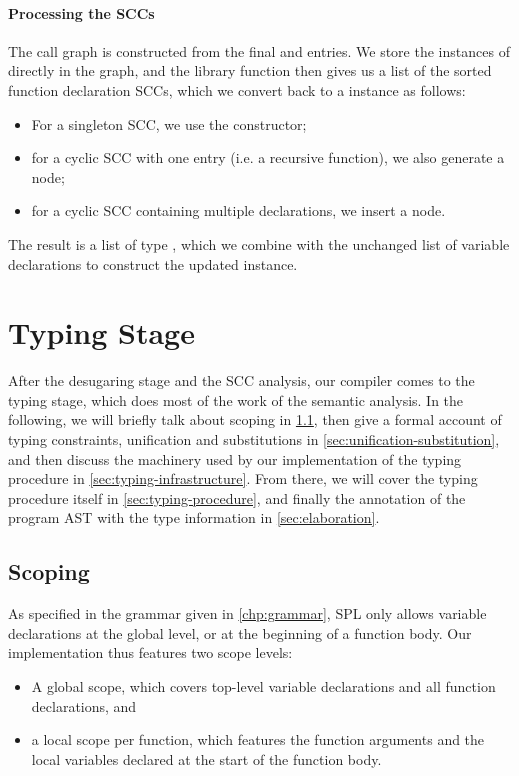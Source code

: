 \paragraph{Processing the SCCs}
The call graph is constructed from the final  and 
entries. We store the instances of  directly in the graph, and
the library function  then gives us a list of the sorted
function declaration SCCs, which we convert back to a  instance
as follows:
\begin{itemize}
  \item For a singleton SCC, we use the  constructor;
  \item for a cyclic SCC with one entry (i.e. a recursive function), we
        also generate a  node;
  \item for a cyclic SCC containing multiple declarations, we insert a
         node.
\end{itemize}
%
The result is a list of type , which we combine with
the unchanged list of variable declarations to construct the updated
 instance.



\section{Typing Stage} \label{sec:typing-stage}

After the desugaring stage and the SCC analysis, our compiler comes to the
typing stage, which does most of the work of the semantic analysis.
In the following, we will briefly talk about scoping in \cref{sec:scoping},
then give a formal account of typing constraints, unification and
substitutions in \cref{sec:unification-substitution}, and then discuss the
machinery used by our implementation of the typing procedure in
\cref{sec:typing-infrastructure}.
From there, we will cover the typing procedure itself in
\cref{sec:typing-procedure}, and finally the annotation of the program AST with
the type information in \cref{sec:elaboration}.



\subsection{Scoping} \label{sec:scoping}
As specified in the grammar given in \cref{chp:grammar}, SPL only allows
variable declarations at the global level, or at the beginning of a function
body. Our implementation thus features two scope levels:
\begin{itemize}
  \item A global scope, which covers top-level variable declarations and all
        function declarations, and
  \item a local scope per function, which features the function arguments and
        the local variables declared at the start of the function body.
\end{itemize}

